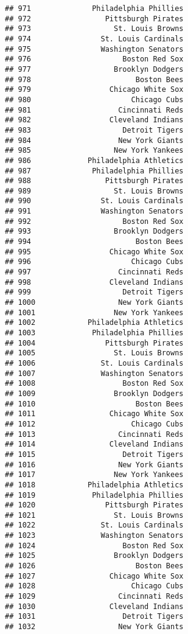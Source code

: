 \documentclass[]{article}
\begin{document}
\begin{verbatim}
## 971              Philadelphia Phillies
## 972                 Pittsburgh Pirates
## 973                   St. Louis Browns
## 974                St. Louis Cardinals
## 975                Washington Senators
## 976                     Boston Red Sox
## 977                   Brooklyn Dodgers
## 978                        Boston Bees
## 979                  Chicago White Sox
## 980                       Chicago Cubs
## 981                    Cincinnati Reds
## 982                  Cleveland Indians
## 983                     Detroit Tigers
## 984                    New York Giants
## 985                   New York Yankees
## 986             Philadelphia Athletics
## 987              Philadelphia Phillies
## 988                 Pittsburgh Pirates
## 989                   St. Louis Browns
## 990                St. Louis Cardinals
## 991                Washington Senators
## 992                     Boston Red Sox
## 993                   Brooklyn Dodgers
## 994                        Boston Bees
## 995                  Chicago White Sox
## 996                       Chicago Cubs
## 997                    Cincinnati Reds
## 998                  Cleveland Indians
## 999                     Detroit Tigers
## 1000                   New York Giants
## 1001                  New York Yankees
## 1002            Philadelphia Athletics
## 1003             Philadelphia Phillies
## 1004                Pittsburgh Pirates
## 1005                  St. Louis Browns
## 1006               St. Louis Cardinals
## 1007               Washington Senators
## 1008                    Boston Red Sox
## 1009                  Brooklyn Dodgers
## 1010                       Boston Bees
## 1011                 Chicago White Sox
## 1012                      Chicago Cubs
## 1013                   Cincinnati Reds
## 1014                 Cleveland Indians
## 1015                    Detroit Tigers
## 1016                   New York Giants
## 1017                  New York Yankees
## 1018            Philadelphia Athletics
## 1019             Philadelphia Phillies
## 1020                Pittsburgh Pirates
## 1021                  St. Louis Browns
## 1022               St. Louis Cardinals
## 1023               Washington Senators
## 1024                    Boston Red Sox
## 1025                  Brooklyn Dodgers
## 1026                       Boston Bees
## 1027                 Chicago White Sox
## 1028                      Chicago Cubs
## 1029                   Cincinnati Reds
## 1030                 Cleveland Indians
## 1031                    Detroit Tigers
## 1032                   New York Giants

\end{verbatim}
\end{document}
